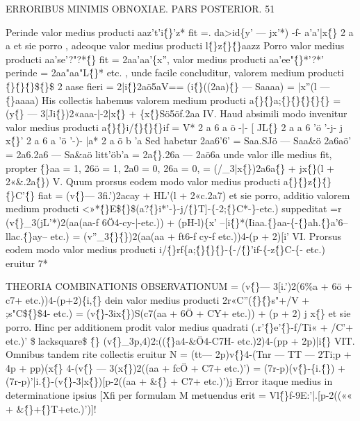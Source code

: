 \documentclass[12pt,a4paper]{article}
\begin{document}
\newpage
\begin{center}
\textsc{ERRORIBUS MINIMIS OBNOXIAE. PARS POSTERIOR. 51}
\end{center}
Perinde valor medius producti aaz't'i\^\{\}'z* fit =. da>id\{y' --- jx'*) -f- a'a'|x\^\{\} 2 a a et sie
porro , adeoque valor medius producti l\^\{\}z\^\{\}\^\{\}aazz
Porro valor medius producti aa'se'?"?*\^\{\} fit = 2aa'aa'\{x'', valor medius producti
aa'ee"\^\{\}*'?*' perinde = 2aa"aa"L\^\{\}* etc. , unde facile concluditur, valorem medium
producti \^\{\}\^\{\}\^\{\}\$\^\{\}\circ\$ 2 aase fieri
= 2|i\^\{\}2aö5aV== (i\^\{\}((2aa)\^\{\} --- Saaaa) = |x''(l --- \^\{\}aaaa)
His collectis habemus valorem medium producti a\^\{\}\^\{\}a;\^\{\}\^\{\}\^\{\}\^\{\}\^\{\}
= (y\^\{\} --- 3[Ji\^\{\})2«aaa-|-2|x\^\{\} + \{x\^\{\}Sö5öf.2aa
IV. Haud absimili modo invenitur valor medius producti a\^\{\}\^\{\}i/\^\{\}\^\{\}\^\{\}if
= V* 2 a 6 a ö -|- [ JL\^\{\} 2 a a 6 'ö '-j- j x\^\{\}' 2 a 6 a 'ö '-)- |a* 2 a ö b 'a
Sed habetur
2aa6'6' = Saa.SJö --- Saa\&ö
2a6aö' = 2a6.2a6 --- Sa\&aö
litt'öb'a = 2a\^\{\}.26a --- 2aö6a
unde valor ille medius fit, propter \^\{\}aa = 1, 26ö = 1, 2a0 = 0, 26a = 0,
= (/\_3|x\^\{\})2a6a\^\{\} + jx\^\{\}(l + 2«\&.2a\^\{\})
V. Quum prorsus eodem modo valor medius producti a\^\{\}\^\{\}z\^\{\}\^\{\}\^\{\}C'\^\{\} fiat
= (v\^\{\}--- 3fi.')2acay + HL'(l + 2«c.2a7)
et sie porro, additio valorem medium producti <»*\^\{\}E\$\^\{\}\circ\$(a?\^\{\}i*'-\}-j/\^\{\}T]\textregistered-\{-2;\^\{\}C*-\}-etc.)
suppeditat
=r (v\^\{\}\_3(jL'*)2(aa(aa-f 6Ö4-cy-|-etc.)) + (pH-l)\{x'
--[i\^\{\}*(Iiaa.\^\{\}aa-\{-\^\{\}ah.\^\{\}a'6--llac.\^\{\}ay-- etc.)
= (v''\_3\^\{\}\^\{\})2(aa(aa + ft6-f cy-f etc.))4-(p + 2)[i'
VI. Prorsus eodem modo valor medius producti i/\^\{\}rf\{a;\^\{\}\^\{\}\^\{\}-\{-/\^\{\}'if-\{-z\^\{\}C-\{-
etc.) eruitur
7*

 THEORIA COMBINATIONIS OBSERVATIONUM
= (v\^\{\}--- 3[i.')2(6\%a + 6ö + c7+ etc.))4-(p+2)\{i,\^\{\}
dein valor medius producti 2r«C''(\^\{\}\^\{\}s"+/V + ;s"C\$\^\{\}\circ\$4- etc.)
= (v\^\{\}-3ix\^\{\})S(c7(aa + 6Ö + CY+ etc.)) + (p + 2) j x\^\{\}
et sie porro. Hinc per additionem prodit valor medius quadrati
(.r'\^\{\}e'\^\{\}-f/Ti« + /C'+ etc.)'
\$lacksquare\$ \^\{\} (v\^\{\}\_3p,4)2:((\^\{\}a4-\&Ö4-C7H- etc.)2)4-(pp + 2p)|i\^\{\}
VIT. Omnibus tandem rite collectis eruitur
N = (tt--- 2p)v\^\{\}4-(Tnr --- TT --- 2Ti;p + 4p + pp)(x\^\{\}
4-(v\^\{\} --- 3(x\^\{\})2((aa + fcÖ + C7+ etc.)')
= (7r-p)(v\^\{\}-\{i.\^\{\}) + (7r-p)'|i.\^\{\}-(v\^\{\}-3|x\^\{\})[p-2((aa + \&\^\{\} + C7+ etc.)')j
Error itaque medius in determinatione ipsius [Xfi per formulam
M
metuendus erit
= Vl\^\{\}f-9E:'|.[p-2((«« + \&\^\{\}+\^\{\}T+etc.)')]!
\end{document}
